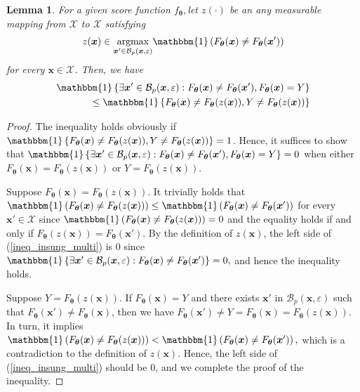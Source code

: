 \documentclass[nohyperref]{article}
\theoremstyle{plain}
\newtheorem{lemma}[theorem]{Lemma}
\theoremstyle{definition}
\theoremstyle{remark}
\begin{document}
\begin{lemma}
\label{lemma2}
For a given score function $f_{\bm{\theta}},$let $z(\cdot)$ be an any measurable mapping from $\mathcal{X}$ to $\mathcal{X}$ satisfying
\begin{equation*}
    z(\bm{x}) \in \underset{\bm{x}' \in \mathcal{B}_{p}(\bm{x}, \varepsilon)}{\operatorname{argmax}} \mathbbm{1} \left( F_{\bm{\theta}}(\bm{x}) \neq F_{\bm{\theta}}(\bm{x}')\right)
\end{equation*}
for every $\bm{x} \in \mathcal{X}$. Then, we have
\begin{align}
    \begin{split}
    \mathbbm{1}\left\{\exists \bm{x}' \in \mathcal{B}_p(\bm{x}, \varepsilon) : F_{\bm{\theta}}(\bm{x})  \neq F_{\bm{\theta}}(\bm{x}'), F_{\bm{\theta}}(\bm{x}) = Y \right\} \\
    \leq \mathbbm{1}\left\{F_{\bm{\theta}}(\bm{x}) \neq F_{\bm{\theta}}(z(\bm{x})), Y \neq F_{\bm{\theta}}(z(\bm{x}))\right\} \label{ineq_insung_multi}
    \end{split}
\end{align}
\end{lemma}
\begin{proof}
The inequality holds obviously if 
$\mathbbm{1}\left\{F_{\bm{\theta}}(\bm{x}) \neq F_{\bm{\theta}}(z(\bm{x})), Y \neq F_{\bm{\theta}}(z(\bm{x}))\right\} = 1$.
Hence, it suffices to show that $\mathbbm{1}\left\{\exists \bm{x}' \in \mathcal{B}_p(\bm{x}, \varepsilon) : F_{\bm{\theta}}(\bm{x})  \neq F_{\bm{\theta}}(\bm{x}'), F_{\bm{\theta}}(\bm{x}) = Y \right\}=0$
when either $F_{\bm{\theta}}(\bm{x}) = F_{\bm{\theta}}(z(\bm{x}))$ or $Y = F_{\bm{\theta}}(z(\bm{x})).$

Suppose $F_{\bm{\theta}}(\bm{x}) = F_{\bm{\theta}}(z(\bm{x})).$
It trivially holds that
$\mathbbm{1} \left( F_{\bm{\theta}}(\bm{x}) \neq F_{\bm{\theta}}(z(\bm{x}))\right) 
\leq \mathbbm{1} \left( F_{\bm{\theta}}(\bm{x}) \neq F_{\bm{\theta}}(\bm{x}')\right)$
for every $\bm{x}' \in \mathcal{X}$ since $\mathbbm{1} \left( F_{\bm{\theta}}(\bm{x}) \neq F_{\bm{\theta}}(z(\bm{x}))\right)=0$ and the equality holds if and only if $F_{\bm{\theta}}(z(\bm{x})) = F_{\bm{\theta}}(\bm{x}')$.
By the definition of $z(\bm{x})$,
the left side of (\ref{ineq_insung_multi}) is $0$ since 
$\mathbbm{1}\left\{\exists \bm{x}' \in \mathcal{B}_p(\bm{x}, \varepsilon) : F_{\bm{\theta}}(\bm{x})  \neq F_{\bm{\theta}}(\bm{x}')\right\} = 0,$
and hence the inequality holds.

Suppose $Y = F_{\bm{\theta}}(z(\bm{x})).$ 
If $F_{\bm{\theta}}(\bm{x}) = Y$ and there exists $\bm{x}'$ in $\mathcal{B}_p(\bm{x}, \varepsilon)$ such that
$F_{\bm{\theta}}(\bm{x}')  \neq F_{\bm{\theta}}(\bm{x})$,
then we have $F_{\bm{\theta}}(\bm{x}') \neq Y = F_{\bm{\theta}}(\bm{x}) = F_{\bm{\theta}}(z(\bm{x}))$. In turn, it implies
$\mathbbm{1} \left( F_{\bm{\theta}}(\bm{x}) \neq F_{\bm{\theta}}(z(\bm{x}))\right) 
< \mathbbm{1} \left( F_{\bm{\theta}}(\bm{x}) \neq F_{\bm{\theta}}(\bm{x}')\right),$ 
which is a contradiction to the definition of $z(\bm{x})$. 
Hence, the left side of (\ref{ineq_insung_multi}) should be $0$, and we complete the proof
of the inequality.
\end{proof}
\end{document}
